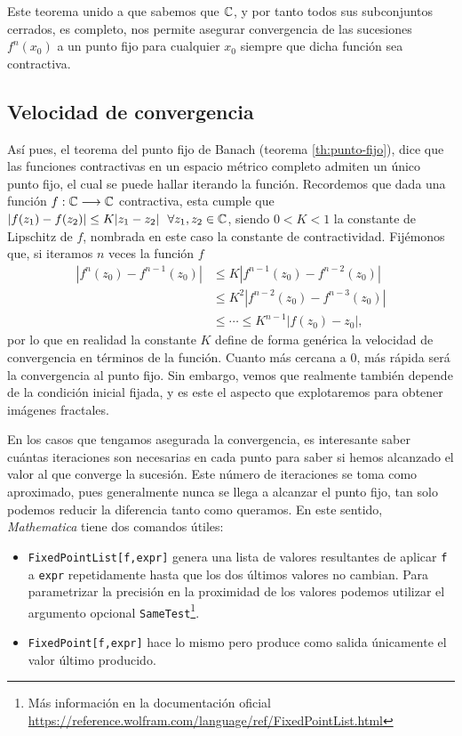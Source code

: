 Este teorema unido a que sabemos que $\mathbb{C}$, y por tanto todos sus subconjuntos cerrados, es completo, nos permite asegurar convergencia de las sucesiones $f^n(x_0)$ a un punto fijo para cualquier $x_0$ siempre que dicha función sea contractiva.

\subsection{Velocidad de convergencia}

Así pues, el teorema del punto fijo de Banach (teorema \ref{th:punto-fijo}), dice que las funciones contractivas en un espacio métrico completo admiten un único punto fijo, el cual se puede hallar iterando la función. Recordemos que dada una función $f:\mathbb{C}\longrightarrow\mathbb{C}$ contractiva, esta cumple que $|f(z_1)-f(z_2)|\leq K|z_1-z_2|\ \ \forall z_1,z_2\in\C$, siendo $0<K<1$ la constante de Lipschitz de $f$, nombrada en este caso la constante de contractividad. Fijémonos que, si iteramos $n$ veces la función $f$
\begin{equation*}
  \begin{split}
    |f^n(z_0)-f^{n-1}(z_0)| & \leq K|f^{n-1}(z_0)-f^{n-2}(z_0)| \\
    & \leq K^2 |f^{n-2}(z_0)-f^{n-3}(z_0)| \\
    & \leq\cdots\leq K^{n-1}|f(z_0)-z_0|,
  \end{split}
\end{equation*}
por lo que en realidad la constante $K$ define de forma genérica la velocidad de convergencia en términos de la función. Cuanto más cercana a $0$, más rápida será la convergencia al punto fijo. Sin embargo, vemos que realmente también depende de la condición inicial fijada, y es este el aspecto que explotaremos para obtener imágenes fractales. 

En los casos que tengamos asegurada la convergencia, es interesante saber cuántas iteraciones son necesarias en cada punto para saber si hemos alcanzado el valor al que converge la sucesión. Este número de iteraciones se toma como aproximado, pues generalmente nunca se llega a alcanzar el punto fijo, tan solo podemos reducir la diferencia tanto como queramos. En este sentido, \textit{Mathematica} tiene dos comandos útiles:

\begin{itemize}
    \item \verb|FixedPointList[f,expr]| genera una lista de valores resultantes de aplicar \verb|f| a \verb|expr| repetidamente hasta que los dos últimos valores no cambian. Para parametrizar la precisión en la proximidad de los valores podemos utilizar el argumento opcional \verb|SameTest|\footnote{Más información en la documentación oficial \url{https://reference.wolfram.com/language/ref/FixedPointList.html}}.
    \item \verb|FixedPoint[f,expr]| hace lo mismo pero produce como salida únicamente el valor último producido.
\end{itemize}


